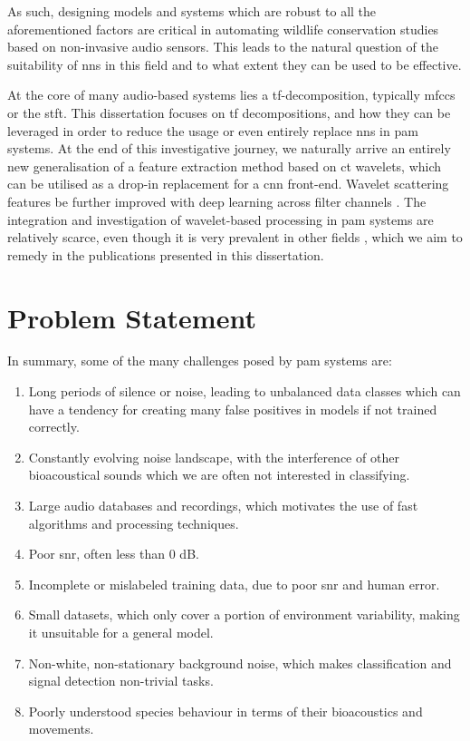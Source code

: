 As such, designing models and systems which are robust to all the aforementioned factors are critical in automating wildlife conservation studies based on non-invasive audio sensors. This leads to the natural question of the suitability of \acp{nn} in this field and to what extent they can be used to be effective.

At the core of many audio-based systems lies a \ac{tf}-decomposition, typically \acp{mfcc} or the \ac{stft}. This dissertation focuses on \ac{tf} decompositions, and how they can be leveraged in order to reduce the usage or even entirely replace \acp{nn} in \ac{pam} systems. At the end of this investigative journey, we naturally arrive an entirely new generalisation of a feature extraction method based on \ac{ct} wavelets, which can be utilised as a drop-in replacement for a \ac{cnn} front-end. Wavelet scattering features be further improved with deep learning across filter channels \cite{nnphasecollapse}. The integration and investigation of wavelet-based processing in \ac{pam} systems are relatively scarce, even though it is very prevalent in other fields \citep{denoising,ws_fault_diag, waveletfault, waveletflight, waveletflow, waveletimagedenoising}, which we aim to remedy in the publications presented in this dissertation.

\section{Problem Statement}
\label{sec:problem}

In summary, some of the many challenges posed by \ac{pam} systems are:
\begin{enumerate}
    \item Long periods of silence or noise, leading to unbalanced data classes which can have a tendency for creating many false positives in models if not trained correctly.
    \item Constantly evolving noise landscape, with the interference of other bioacoustical sounds which we are often not interested in classifying.
    \item Large audio databases and recordings, which motivates the use of fast algorithms and processing techniques.
    \item Poor \ac{snr}, often less than 0 dB.
    \item Incomplete or mislabeled training data, due to poor \ac{snr} and human error.
    \item Small datasets, which only cover a portion of environment variability, making it unsuitable for a general model.
    \item Non-white, non-stationary background noise, which makes classification and signal detection non-trivial tasks.
    \item Poorly understood species behaviour in terms of their bioacoustics and movements.
\end{enumerate}

